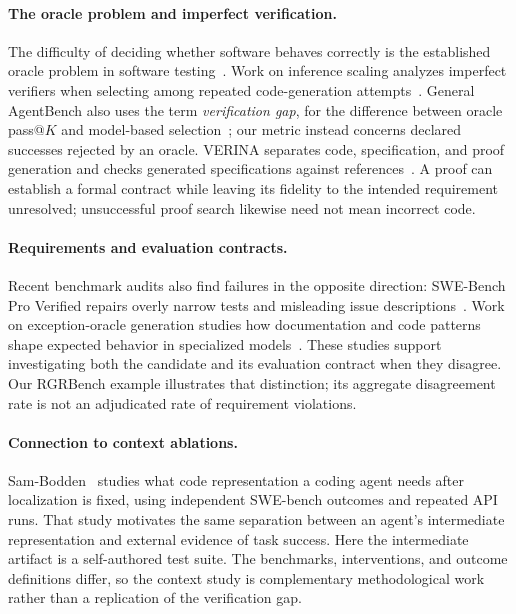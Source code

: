 \documentclass{article}
\begin{document}
\paragraph{The oracle problem and imperfect verification.}
The difficulty of deciding whether software behaves correctly is the established oracle
problem in software testing~\cite{barr2015oracle}. Work on inference scaling analyzes
imperfect verifiers when selecting among repeated code-generation attempts~\cite{stroebl2026resampling}.
General AgentBench also uses the term \emph{verification gap}, for the difference between
oracle pass@$K$ and model-based selection~\cite{li2026generalagentbench}; our metric
instead concerns declared successes rejected by an oracle. VERINA separates code,
specification, and proof generation and checks generated specifications against references~\cite{ye2026verina}.
A proof can establish a formal contract while leaving its fidelity to the intended
requirement unresolved; unsuccessful proof search likewise need not mean incorrect code.

\paragraph{Requirements and evaluation contracts.}
Recent benchmark audits also find failures in the opposite direction: SWE-Bench Pro
Verified repairs overly narrow tests and misleading issue descriptions~\cite{zheng2026sweproverified}.
Work on exception-oracle generation studies how documentation and code patterns shape
expected behavior in specialized models~\cite{hossain2026exceptionpatterns}. These studies support investigating
both the candidate and its evaluation contract when they disagree. Our RGRBench example
illustrates that distinction; its aggregate disagreement rate is not an adjudicated
rate of requirement violations.

\paragraph{Connection to context ablations.}
Sam-Bodden~\cite{sambodden2026context} studies what code representation a coding agent needs
after localization is fixed, using independent SWE-bench outcomes and repeated API runs.
That study motivates the same separation between an agent's intermediate representation and
external evidence of task success. Here the intermediate artifact is a self-authored test
suite. The benchmarks, interventions, and outcome definitions differ, so the context study
is complementary methodological work rather than a replication of the verification gap.
\end{document}
